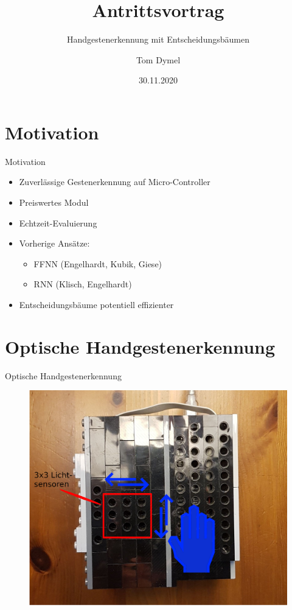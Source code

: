 \documentclass[10pt]{beamer}
\title{Antrittsvortrag}
\subtitle{Handgestenerkennung mit Entscheidungsbäumen}
\date{30.11.2020}
\author{Tom Dymel}
\institute{Forschungsprojekt und Seminar\\Technische Universität Hamburg}
\begin{document}
\maketitle

\section{Motivation}
\begin{frame}{Motivation}
\begin{itemize}
    \item Zuverlässige Gestenerkennung auf Micro-Controller
    \item Preiswertes Modul
    \item Echtzeit-Evaluierung 
    \item Vorherige Ansätze:
    \begin{itemize}
        \item FFNN (Engelhardt, Kubik, Giese)
        \item RNN (Klisch, Engelhardt)
    \end{itemize}
    \item Entscheidungsbäume potentiell effizienter
\end{itemize}
\end{frame}

\section{Optische Handgestenerkennung}
\begin{frame}{Optische Handgestenerkennung}
\begin{figure}
    \includegraphics[width=0.9\linewidth]{aufgabe.png}
  \end{figure}
\end{frame}
\end{document}
